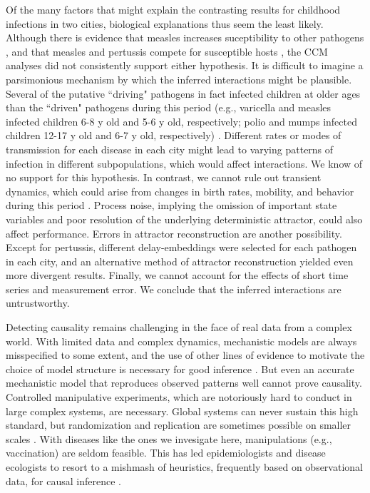 \documentclass[10pt,letterpaper]{article}
\begin{document}
Of the many factors that might explain the contrasting results for childhood infections in two cities, biological explanations thus seem the least likely. 
Although there is evidence that measles increases suceptibility to other pathogens \cite{Mina2015}, and that measles and pertussis compete for susceptible hosts \cite{Rohani2003}, the CCM analyses did not consistently support either hypothesis. 
It is difficult to imagine a parsimonious mechanism by which the inferred interactions might be plausible.
Several of the putative ``driving" pathogens in fact infected children at older ages than the ``driven" pathogens during this period (e.g., varicella and measles infected  children 6-8 y old and 5-6 y old, respectively; polio and mumps infected children 12-17 y old and 6-7 y old, respectively) \cite{Anderson1985}.
Different rates or modes of transmission for each disease in each city might lead to varying patterns of infection in different subpopulations, which would affect interactions.
We know of no support for this hypothesis.
In contrast, we cannot rule out transient dynamics, which could arise from changes in birth rates, mobility, and behavior during this period \cite{Earn2000}.
Process noise, implying the omission of important state variables and poor resolution of the underlying deterministic attractor, could also affect performance. 
Errors in attractor reconstruction are another possibility. 
Except for pertussis, different delay-embeddings were selected for each pathogen in each city, and an alternative method of attractor reconstruction yielded even more divergent results. 
Finally, we cannot account for the effects of short time series and measurement error.
We conclude that the inferred interactions are untrustworthy.

Detecting causality remains challenging in the face of real data from a complex world.
With limited data and complex dynamics, mechanistic models are always misspecified to some extent, and the use of other lines of evidence to motivate the choice of model structure is necessary for good inference \cite{BurnhamAnderson, He2009, Yodzis1988, Wood1999, Grad2012}.
But even an accurate mechanistic model that reproduces observed patterns well cannot prove causality. 
Controlled manipulative experiments, which are notoriously hard to conduct in large complex systems, are necessary.
Global systems can never sustain this high standard, but randomization and replication are sometimes possible on smaller scales \cite{Simberloff1969, Hurlbert1984, Tilman1989}.
With diseases like the ones we invesigate here, manipulations (e.g., vaccination) are seldom feasible. 
This has led epidemiologists and disease ecologists to resort to a mishmash of heuristics, frequently based on observational data, for causal inference \cite{Plowright2008}.
\end{document}
